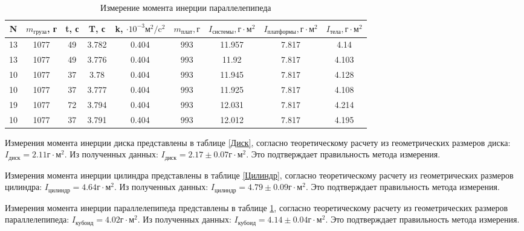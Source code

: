 \documentclass[a4, 12pt]{article}
\begin{document}
\begin{table} \label{Параллелепипед} \caption{Измерение момента инерции параллелепипеда} \begin{tabular}{|c|c|c|c|c|c|c|c|c|} \hline N & $m_\text{груза}$, г & t, с & T, с & k, $\cdot 10^{-3}\text{м}^2/\text{c}^2$ & $m_\text{плат}, г$ & $I_\text{системы}, \text{г}\cdot \text{м}^2$ &$I_\text{платформы}, \text{г}\cdot \text{м}^2$ & $I_\text{тела}, \text{г}\cdot \text{м}^2$ \\ \hline 13 & 1077 & 49 & 3.782 & 0.404 & 993 & 11.957 & 7.817 & 4.14 \\ \hline 13 & 1077 & 49 & 3.776 & 0.404 & 993 & 11.92 & 7.817 & 4.103 \\ \hline 10 & 1077 & 37 & 3.78 & 0.404 & 993 & 11.945 & 7.817 & 4.128 \\ \hline 10 & 1077 & 37 & 3.777 & 0.404 & 993 & 11.925 & 7.817 & 4.108 \\ \hline 19 & 1077 & 72 & 3.794 & 0.404 & 993 & 12.031 & 7.817 & 4.214 \\ \hline 10 & 1077 & 37 & 3.791 & 0.404 & 993 & 12.012 & 7.817 & 4.195 \\ \hline \end{tabular} \end{table}


Измерения момента инерции диска представлены в таблице \ref{Диск}, согласно теоретическому расчету из геометрических размеров диска: $I_\text{диск}=2.11 \text{г}\cdot \text{м}^2$. Из полученных данных: $I_\text{диск}=2.17 \pm 0.07 \text{г}\cdot \text{м}^2$. Это подтверждает правильность метода измерения.

Измерения момента инерции цилиндра представлены в таблице \ref{Цилиндр}, согласно теоретическому расчету из геометрических размеров цилиндра: $I_\text{цилиндр}=4.64 \text{г}\cdot \text{м}^2$. Из полученных данных: $I_\text{цилиндр}=4.79 \pm 0.09 \text{г}\cdot \text{м}^2$. Это подтверждает правильность метода измерения.

Измерения момента инерции параллелепипеда представлены в таблице \ref{Параллелепипед}, согласно теоретическому расчету из геометрических размеров параллелепипеда: $I_\text{кубоид}=4.02 \text{г}\cdot \text{м}^2$. Из полученных данных: $I_\text{кубоид}=4.14 \pm 0.04 \text{г}\cdot \text{м}^2$. Это подтверждает правильность метода измерения.
\end{document}
